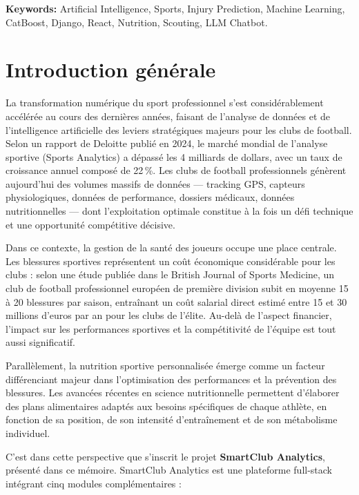 \documentclass{modificopy}
\begin{document}
\vspace{0.5cm}
\textbf{Keywords:} Artificial Intelligence, Sports, Injury Prediction, Machine Learning, CatBoost, Django, React, Nutrition, Scouting, LLM Chatbot.

\newpage

\chapter*{Introduction générale}

La transformation numérique du sport professionnel s'est considérablement accélérée au cours des dernières années, faisant de l'analyse de données et de l'intelligence artificielle des leviers stratégiques majeurs pour les clubs de football. Selon un rapport de Deloitte publié en 2024, le marché mondial de l'analyse sportive (Sports Analytics) a dépassé les 4 milliards de dollars, avec un taux de croissance annuel composé de 22\,\%. Les clubs de football professionnels génèrent aujourd'hui des volumes massifs de données — tracking GPS, capteurs physiologiques, données de performance, dossiers médicaux, données nutritionnelles — dont l'exploitation optimale constitue à la fois un défi technique et une opportunité compétitive décisive.

Dans ce contexte, la gestion de la santé des joueurs occupe une place centrale. Les blessures sportives représentent un coût économique considérable pour les clubs : selon une étude publiée dans le British Journal of Sports Medicine, un club de football professionnel européen de première division subit en moyenne 15 à 20 blessures par saison, entraînant un coût salarial direct estimé entre 15 et 30 millions d'euros par an pour les clubs de l'élite. Au-delà de l'aspect financier, l'impact sur les performances sportives et la compétitivité de l'équipe est tout aussi significatif.

Parallèlement, la nutrition sportive personnalisée émerge comme un facteur différenciant majeur dans l'optimisation des performances et la prévention des blessures. Les avancées récentes en science nutritionnelle permettent d'élaborer des plans alimentaires adaptés aux besoins spécifiques de chaque athlète, en fonction de sa position, de son intensité d'entraînement et de son métabolisme individuel.

C'est dans cette perspective que s'inscrit le projet \textbf{SmartClub Analytics}, présenté dans ce mémoire. SmartClub Analytics est une plateforme full-stack intégrant cinq modules complémentaires :
\end{document}
